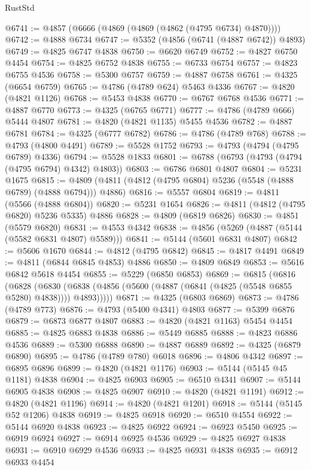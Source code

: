 \begin{lexlean}{RustStd}
\begin{coremodule}
{\begin{coremodule}
{{{{{{{{{{{{{{{{{{{{{{{{{{{{{{{{{{{{{{{{{{{{{{{{{{{{{{{{{{{{{{{{{{{{{{{{{{{{{{{{@6741 := @4857 (@6666 (@4869 (@4869 (@4862 (@4795 @6734) @4870))))
@6742 := @4888 @6734
@6747 := @5352 (@4856 (@6741 (@4887 @6742)) @4893)
@6749 := @4825 @6747 @4838
@6750 := @6620 @6749
@6752 := @4827 @6750 @4454
@6754 := @4825 @6752 @4838
@6755 := @6733 @6754
@6757 := @4823 @6755 @4536
@6758 := @5300 @6757
@6759 := @4887 @6758
@6761 := @4325 (@6654 @6759)
@6765 := @4786 (@4789 @624) @5463 @4336
@6767 := @4820 (@4821 @1126)
@6768 := @5453 @4838
@6770 := @6767 @6768 @4536
@6771 := @4887 @6770
@6773 := @4325 (@6765 @6771)
@6777 := @4786 (@4789 @666) @5444 @4807
@6781 := @4820 (@4821 @1135) @5455 @4536
@6782 := @4887 @6781
@6784 := @4325 (@6777 @6782)
@6786 := @4786 (@4789 @768)
@6788 := @4793 (@4800 @4491)
@6789 := @5528 @1752
@6793 := @4793 (@4794 (@4795 @6789) @4336)
@6794 := @5528 @1833
@6801 := @6788 (@6793 (@4793 (@4794 (@4795 @6794) @4342) @4803))
@6803 := @6786 @6801 @4807
@6804 := @5231 @1675
@6815 := @4809 (@4811 (@4812 (@4795 @6804) @5236 (@5548 (@4888 @6789) (@4888 @6794))) @4886)
@6816 := @5557 @6804
@6819 := @4811 (@5566 (@4888 @6804))
@6820 := @5231 @1654
@6826 := @4811 (@4812 (@4795 @6820) @5236 @5335) @4886
@6828 := @4809 (@6819 @6826)
@6830 := @4851 (@5579 @6820)
@6831 := @4553 @4342
@6838 := @4856 (@5269 (@4887 (@5144 (@5582 @6831 @4807) @5589)))
@6841 := @5144 (@5601 @6831 @4807)
@6842 := @5606 @1670
@6844 := @4812 (@4795 @6842)
@6845 := @4817 @4491
@6849 := @4811 (@6844 @6845 @4853) @4886
@6850 := @4809 @6849
@6853 := @5616 @6842 @5618 @4454
@6855 := @5229 (@6850 @6853)
@6869 := @6815
    (@6816
      (@6828
        (@6830 (@6838 (@4856 (@5600 (@4887 (@6841 (@4825 (@5548 @6855 @5280) @4838)))) @4893)))))
@6871 := @4325 (@6803 @6869)
@6873 := @4786 (@4789 @773)
@6876 := @4793 (@5400 @4341) @4803
@6877 := @5399 @6876
@6879 := @6873 @6877 @4807
@6883 := @4820 (@4821 @1163) @5454 @4454
@6885 := @4825 @6883 @4838
@6886 := @5449 @6885
@6888 := @4823 @6886 @4536
@6889 := @5300 @6888
@6890 := @4887 @6889
@6892 := @4325 (@6879 @6890)
@6895 := @4786 (@4789 @780) @6018
@6896 := @4806 @4342
@6897 := @6895 @6896
@6899 := @4820 (@4821 @1176)
@6903 := @5144 (@5145 @45 @1181) @4838
@6904 := @4825 @6903
@6905 := @6510 @4341
@6907 := @5144 @6905 @4838
@6908 := @4825 @6907
@6910 := @4820 (@4821 @1191)
@6912 := @4820 (@4821 @1196)
@6914 := @4820 (@4821 @1201)
@6918 := @5144 (@5145 @52 @1206) @4838
@6919 := @4825 @6918
@6920 := @6510 @4554
@6922 := @5144 @6920 @4838
@6923 := @4825 @6922
@6924 := @6923 @5450
@6925 := @6919 @6924
@6927 := @6914 @6925 @4536
@6929 := @4825 @6927 @4838
@6931 := @6910 @6929 @4536
@6933 := @4825 @6931 @4838
@6935 := @6912 @6933 @4454
}}}}}}}}}}}}}}}}}}}}}}}}}}}}}}}}}}}}}}}}}}}}}}}}}}}}}}}}}}}}}}}}}}}}}}}}}}}}}}}}
\end{coremodule}}
\end{coremodule}
\end{lexlean}
